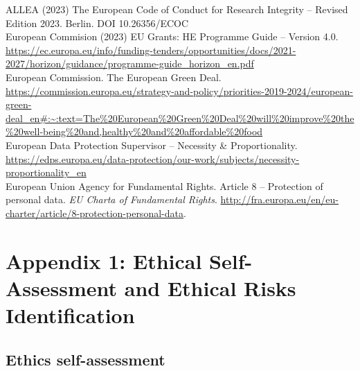 \documentclass[
]{article}
\begin{document}
ALLEA (2023) The European Code of Conduct for Research Integrity -- Revised Edition 2023. Berlin. DOI 10.26356/ECOC\\
European Commision (2023) EU Grants: HE Programme Guide -- Version 4.0. \url{https://ec.europa.eu/info/funding-tenders/opportunities/docs/2021-2027/horizon/guidance/programme-guide_horizon_en.pdf}\\
European Commission. The European Green Deal. \url{https://commission.europa.eu/strategy-and-policy/priorities-2019-2024/european-green-deal_en\#:~:text=The\%20European\%20Green\%20Deal\%20will\%20improve\%20the\%20well-being\%20and,healthy\%20and\%20affordable\%20food}\\
European Data Protection Supervisor -- Necessity \& Proportionality. \url{https://edps.europa.eu/data-protection/our-work/subjects/necessity-proportionality_en}\\
European Union Agency for Fundamental Rights. Article 8 -- Protection of personal data. \emph{EU Charta of Fundamental Rights}. \url{http://fra.europa.eu/en/eu-charter/article/8-protection-personal-data}.

\hypertarget{appendix-1-ethical-self-assessment-and-ethical-risks-identification}{%
\section{\texorpdfstring{\textbf{Appendix 1: Ethical Self-Assessment and Ethical Risks Identification}}{Appendix 1: Ethical Self-Assessment and Ethical Risks Identification}}\label{appendix-1-ethical-self-assessment-and-ethical-risks-identification}}

\hypertarget{ethics-self-assessment}{%
\subsection{Ethics self-assessment}\label{ethics-self-assessment}}
\end{document}
